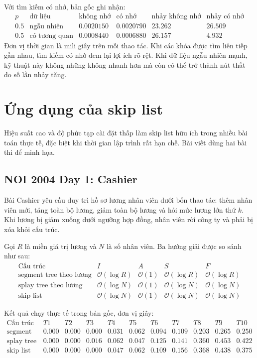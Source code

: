 \documentclass[11pt]{article}
\newcommand{\Oh}{\mathcal{O}}
\begin{document}
Với tìm kiếm có nhớ, bản gốc ghi nhận:
\[
\begin{array}{llrrrr}
p & \text{dữ liệu} & \text{không nhớ} & \text{có nhớ} &
\text{nhảy không nhớ} & \text{nhảy có nhớ}\\
\hline
0.5 & \text{ngẫu nhiên} & 0.0020150 & 0.0020790 & 23.262 & 26.509\\
0.5 & \text{có tương quan} & 0.0008440 & 0.0006880 & 26.157 & 4.932
\end{array}
\]
Đơn vị thời gian là mili giây trên mỗi thao tác. Khi các khóa được tìm liên
tiếp gần nhau, tìm kiếm có nhớ đem lại lợi ích rõ rệt. Khi dữ liệu ngẫu nhiên
mạnh, kỹ thuật này không những không nhanh hơn mà còn có thể trở thành nút
thắt do số lần nhảy tăng.

\section{Ứng dụng của skip list}

Hiệu suất cao và độ phức tạp cài đặt thấp làm skip list hữu ích trong nhiều
bài toán thực tế, đặc biệt khi thời gian lập trình rất hạn chế. Bài viết dùng
hai bài thi để minh họa.

\subsection{NOI 2004 Day 1: Cashier}

Bài Cashier yêu cầu duy trì hồ sơ lương nhân viên dưới bốn thao tác: thêm nhân
viên mới, tăng toàn bộ lương, giảm toàn bộ lương và hỏi mức lương lớn thứ
\(k\). Khi lương bị giảm xuống dưới ngưỡng hợp đồng, nhân viên rời công ty và
phải bị xóa khỏi cấu trúc.

Gọi \(R\) là miền giá trị lương và \(N\) là số nhân viên. Ba hướng giải được
so sánh như sau:
\[
\begin{array}{lllll}
\text{Cấu trúc} & I & A & S & F\\
\hline
\text{segment tree theo lương} & \Oh(\log R) & \Oh(1) & \Oh(\log R) & \Oh(\log R)\\
\text{splay tree theo lương} & \Oh(\log N) & \Oh(1) & \Oh(\log N) & \Oh(\log N)\\
\text{skip list} & \Oh(\log N) & \Oh(1) & \Oh(\log N) & \Oh(\log N)
\end{array}
\]

Kết quả chạy thực tế trong bản gốc, đơn vị giây:
\[
\begin{array}{lrrrrrrrrrr}
\text{Cấu trúc} & T1&T2&T3&T4&T5&T6&T7&T8&T9&T10\\
\hline
\text{segment tree} & 0.000&0.000&0.000&0.031&0.062&0.094&0.109&0.203&0.265&0.250\\
\text{splay tree} & 0.000&0.000&0.016&0.062&0.047&0.125&0.141&0.360&0.453&0.422\\
\text{skip list} & 0.000&0.000&0.000&0.047&0.062&0.109&0.156&0.368&0.438&0.375
\end{array}
\]
\end{document}
